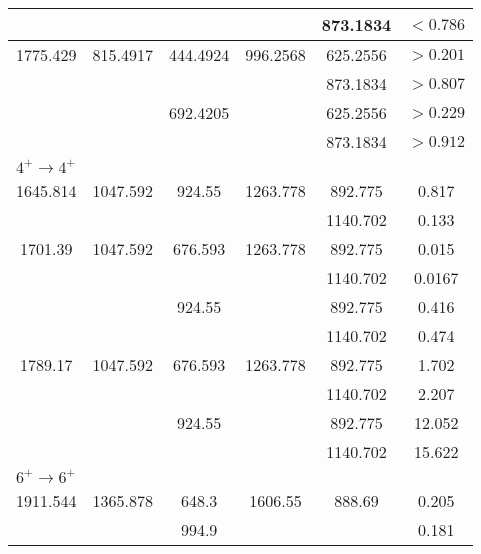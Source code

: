 \begin{longtable}{c|c|c|c|c|c}
         &  &  &  & 873.1834 & $<0.786$  \\ \hline
        1775.429 & 815.4917 & 444.4924 & 996.2568 & 625.2556 & $>0.201$  \\
         &  &  &  & 873.1834 & $>0.807$  \\
         &  & 692.4205 &  & 625.2556 & $>0.229$  \\
         &  &  &  & 873.1834 & $>0.912$  \\ \hline
        \multicolumn{6}{l}{$4^+\rightarrow 4^+$} 	\\ \hline
        1645.814 & 1047.592 & 924.55 & 1263.778 & 892.775 &  0.817  \\ 
         &  &  &  & 1140.702 & 0.133  \\ \hline
        1701.39 & 1047.592 & 676.593 & 1263.778 & 892.775 & 0.015   \\
         &  &  &  & 1140.702 & 0.0167  \\
         &  & 924.55 &  & 892.775 & 0.416   \\
         &  &  &  & 1140.702 & 0.474  \\ \hline
        1789.17 & 1047.592 & 676.593 & 1263.778 & 892.775 & 1.702   \\
         &  &  &  & 1140.702 & 2.207  \\
         &  & 924.55 &  & 892.775 & 12.052   \\
         &  &  &  & 1140.702 & 15.622  \\ \hline
        \multicolumn{6}{l}{$6^+\rightarrow 6^+$} 	\\ \hline
        1911.544 & 1365.878 & 648.3 & 1606.55 & 888.69 & 0.205 \\
        &  &  994.9  &  &  &  0.181   \\
        \bottomrule
    \end{longtable}
